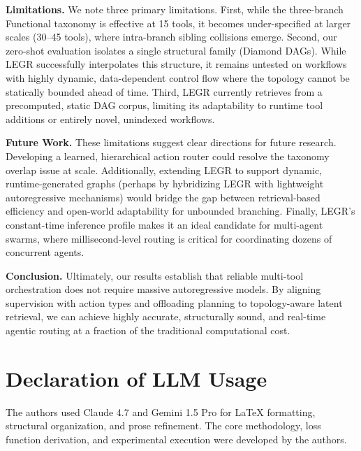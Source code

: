 \documentclass{article}
\begin{document}
\textbf{Limitations.} We note three primary limitations. First, while the three-branch Functional taxonomy is effective at 15 tools, it becomes under-specified at larger scales (30--45 tools), where intra-branch sibling collisions emerge. Second, our zero-shot evaluation isolates a single structural family (Diamond DAGs). While LEGR successfully interpolates this structure, it remains untested on workflows with highly dynamic, data-dependent control flow where the topology cannot be statically bounded ahead of time. Third, LEGR currently retrieves from a precomputed, static DAG corpus, limiting its adaptability to runtime tool additions or entirely novel, unindexed workflows.

\textbf{Future Work.} These limitations suggest clear directions for future research. Developing a learned, hierarchical action router could resolve the taxonomy overlap issue at scale. Additionally, extending LEGR to support dynamic, runtime-generated graphs (perhaps by hybridizing LEGR with lightweight autoregressive mechanisms) would bridge the gap between retrieval-based efficiency and open-world adaptability for unbounded branching. Finally, LEGR's constant-time inference profile makes it an ideal candidate for multi-agent swarms, where millisecond-level routing is critical for coordinating dozens of concurrent agents.

\textbf{Conclusion.} Ultimately, our results establish that reliable multi-tool orchestration does not require massive autoregressive models. By aligning supervision with action types and offloading planning to topology-aware latent retrieval, we can achieve highly accurate, structurally sound, and real-time agentic routing at a fraction of the traditional computational cost.

\section*{Declaration of LLM Usage}
The authors used Claude 4.7 and Gemini 1.5 Pro for LaTeX formatting, structural organization, and prose refinement. The core methodology, loss function derivation, and experimental execution were developed by the authors.


\nocite{*}

\medskip
\small


\end{document}

